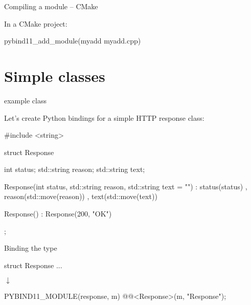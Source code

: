 \documentclass[10pt]{beamer}
\newcommand\cpp[1]{\cpluspluslogo #1}
\newcommand\darrow{\parbox{3cm}{\centering$\downarrow$}\smallskip}
\newcommand\hlbox[2]{\setlength{\fboxsep}{0pt}\colorbox{#1}{#2}}
\newcommand\hlcode[1]{\hlbox{lgreen}{\detokenize{#1}}}
\begin{document}
\begin{frame}[fragile]{Compiling a module -- CMake}

    In a CMake project:

    \begin{shcode}
        pybind11_add_module(myadd myadd.cpp)
    \end{shcode}

\end{frame}


\section{Simple classes}


\begin{frame}[fragile]{\cpp{} example class}

    Let's create Python bindings for a simple HTTP response class:

    \begin{cppcode}
        #include <string>

        struct Response {
            int status;
            std::string reason;
            std::string text;

            Response(int status,
                     std::string reason,
                     std::string text = "")
                : status(status)
                , reason(std::move(reason))
                , text(std::move(text))
            {}

            Response() : Response(200, "OK")  {}
        };
    \end{cppcode}

\end{frame}


\begin{frame}[fragile]{Binding the type}

    \begin{cppcode}
        struct Response {
            ...
        }
    \end{cppcode}

    \pause \darrow

    \begin{cppcode}
        PYBIND11_MODULE(response, m) {
            @\hlcode{py::class_}@<Response>(m, "Response");
        }
    \end{cppcode}

\end{frame}
\end{document}
